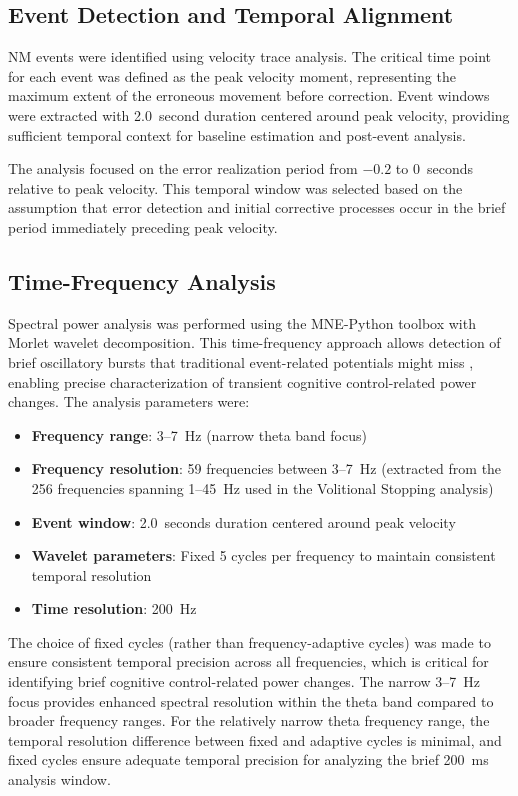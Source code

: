 \documentclass[11pt]{article}
\begin{document}
\subsection{Event Detection and Temporal Alignment}

NM events were identified using velocity trace analysis. The critical time point for each event was defined as the peak velocity moment, representing the maximum extent of the erroneous movement before correction. Event windows were extracted with 2.0~second duration centered around peak velocity, providing sufficient temporal context for baseline estimation and post-event analysis.

The analysis focused on the error realization period from $-0.2$ to $0$~seconds relative to peak velocity. This temporal window was selected based on the assumption that error detection and initial corrective processes occur in the brief period immediately preceding peak velocity.

\subsection{Time-Frequency Analysis}

Spectral power analysis was performed using the MNE-Python toolbox with Morlet wavelet decomposition. This time-frequency approach allows detection of brief oscillatory bursts that traditional event-related potentials might miss \citep{makeig2004mining}, enabling precise characterization of transient cognitive control-related power changes. The analysis parameters were:

\begin{itemize}
\item \textbf{Frequency range}: 3--7~Hz (narrow theta band focus)
\item \textbf{Frequency resolution}: 59 frequencies between 3--7~Hz (extracted from the 256 frequencies spanning 1--45~Hz used in the Volitional Stopping analysis)
\item \textbf{Event window}: 2.0~seconds duration centered around peak velocity
\item \textbf{Wavelet parameters}: Fixed 5 cycles per frequency to maintain consistent temporal resolution 
\item \textbf{Time resolution}: 200~Hz 
\end{itemize}

The choice of fixed cycles (rather than frequency-adaptive cycles) was made to ensure consistent temporal precision across all frequencies, which is critical for identifying brief cognitive control-related power changes. The narrow 3--7~Hz focus provides enhanced spectral resolution within the theta band compared to broader frequency ranges. For the relatively narrow theta frequency range, the temporal resolution difference between fixed and adaptive cycles is minimal, and fixed cycles ensure adequate temporal precision for analyzing the brief 200~ms analysis window.
\end{document}
